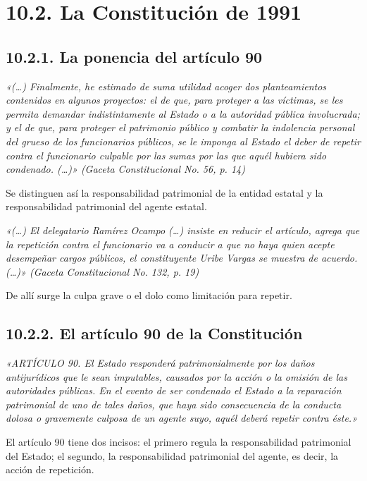 \section{10.2. La Constitución de 1991}
\subsection{10.2.1. La ponencia del artículo 90}
\begin{cita}
\textit{«(…) Finalmente, he estimado de suma utilidad acoger dos planteamientos contenidos en algunos proyectos: el de que, para proteger a las víctimas, se les permita demandar indistintamente al Estado o a la autoridad pública involucrada; y el de que, para proteger el patrimonio público y combatir la indolencia personal del grueso de los funcionarios públicos, se le imponga al Estado el deber de repetir contra el funcionario culpable por las sumas por las que aquél hubiera sido condenado. (…)» (Gaceta Constitucional No. 56, p. 14)}
\end{cita}
Se distinguen así la responsabilidad patrimonial de la entidad estatal y la responsabilidad patrimonial del agente estatal.

\begin{cita}
\textit{«(…) El delegatario Ramírez Ocampo (…) insiste en reducir el artículo, agrega que la repetición contra el funcionario va a conducir a que no haya quien acepte desempeñar cargos públicos, el constituyente Uribe Vargas se muestra de acuerdo. (…)» (Gaceta Constitucional No. 132, p. 19)}
\end{cita}
De allí surge la culpa grave o el dolo como limitación para repetir.

\subsection{10.2.2. El artículo 90 de la Constitución}
\begin{cita}
\textit{«ARTÍCULO 90. El Estado responderá patrimonialmente por los daños antijurídicos que le sean imputables, causados por la acción o la omisión de las autoridades públicas. En el evento de ser condenado el Estado a la reparación patrimonial de uno de tales daños, que haya sido consecuencia de la conducta dolosa o gravemente culposa de un agente suyo, aquél deberá repetir contra éste.»}
\end{cita}
El artículo 90 tiene dos incisos: el primero regula la responsabilidad patrimonial del Estado; el segundo, la responsabilidad patrimonial del agente, es decir, la acción de repetición.

